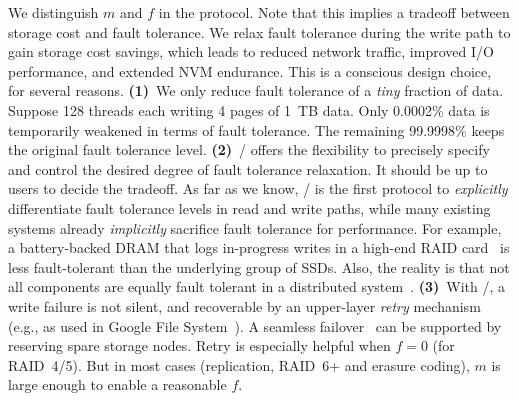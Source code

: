 We distinguish $m$ and $f$ in the protocol. Note that this implies a tradeoff between
storage cost and fault tolerance. We relax fault tolerance during the write
path to gain storage cost savings, which leads to reduced network traffic,
improved I/O performance, and extended NVM endurance. This is a conscious
design choice, for several reasons. \textbf{(1)}~We only reduce fault tolerance
of a \emph{tiny} fraction of data.  Suppose 128 threads each writing 4 pages of
1~TB data. Only 0.0002\% data is temporarily weakened in terms of fault
tolerance. The remaining 99.9998\% keeps the original fault tolerance level.
\textbf{(2)}~\protocol/ offers the flexibility to precisely specify and control
the desired degree of fault tolerance relaxation. It should be up to users to decide
the tradeoff. As far as we know, \protocol/ is the first protocol to
\emph{explicitly} differentiate fault tolerance levels in read and write paths,
while many existing systems already \emph{implicitly} sacrifice fault tolerance
for performance.  For example, a battery-backed DRAM that logs in-progress writes
in a high-end RAID card~\cite{Denehy:2005:JRS:1251028.1251035} is less
fault-tolerant than the underlying group of SSDs. Also, the reality is that not
all components are equally fault tolerant in a distributed
system~\cite{Ford:2010:AGD:1924943.1924948}.  \textbf{(3)}~With \protocol/, a
write failure is not silent, and recoverable by an upper-layer \emph{retry}
mechanism (e.g., as used in Google File
System~\cite{Ghemawat:2003:GFS:945445.945450}). A seamless
failover~\cite{5388891, 6136239} can be supported by reserving spare storage
nodes. Retry is especially helpful when $f=0$ (for RAID~4/5).  But
in most cases (replication, RAID~6+ and erasure coding), $m$ is large enough to
enable a reasonable $f$.

